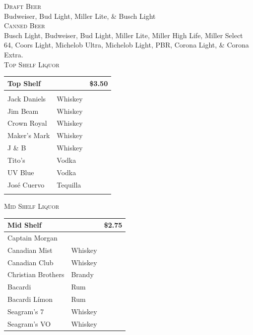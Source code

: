 \documentclass[a0,landscape]{a0poster}
\begin{document}
\begin{multicols}{4}
\vspace{1cm}

\noindent \textsc{Draft Beer} \\
Budweiser, Bud Light, Miller Lite, \& Busch Light \\

\noindent \textsc {Canned Beer} \\
Busch Light, Budweiser, Bud Light, Miller Lite, Miller High Life, Miller Select 64, Coors Light, Michelob Ultra, Michelob Light, PBR, Corona Light, \& Corona Extra. \\

\noindent \textsc{Top Shelf Liquor} \\

\begin{center}
\begin{tabular}{ l l r }

Top Shelf & &\$3.50 \\
\hline
& & \\
Jack Daniels & Whiskey &\\
Jim Beam & Whiskey &\\
Crown Royal & Whiskey &\\
Maker's Mark & Whiskey &\\
J \& B & Whiskey & \\
Tito's & Vodka &\\
UV Blue & Vodka &\\
Jos\'e Cuervo & Tequilla & \\
& & \\
\hline
\end{tabular}
\end{center}

\vspace{.5cm}

\noindent \textsc{Mid Shelf Liquor} \\
\begin{center}
\begin{tabular}{ l l r }
Mid Shelf & &\$2.75 \\
\hline
Captain Morgan & & \\
Canadian Mist & Whiskey & \\
Canadian Club & Whiskey & \\
Christian Brothers & Brandy & \\
Bacardi & Rum & \\
Bacardi L\'imon & Rum & \\
Seagram's 7 & Whiskey & \\
Seagram's VO & Whiskey & \\


\end{tabular}
\end{center}
\end{multicols}
\end{document}
